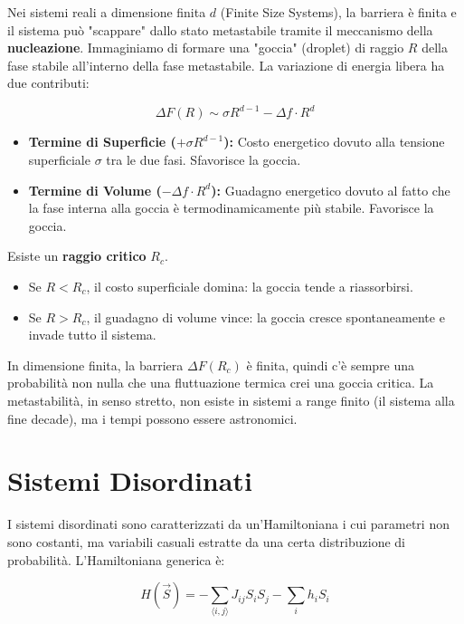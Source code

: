 Nei sistemi reali a dimensione finita $d$ (Finite Size Systems), la barriera è finita e il sistema può "scappare" dallo stato metastabile tramite il meccanismo della \textbf{nucleazione}.
Immaginiamo di formare una "goccia" (droplet) di raggio $R$ della fase stabile all'interno della fase metastabile. La variazione di energia libera ha due contributi:

\begin{equation}
    \Delta F(R) \sim \sigma R^{d-1} - \Delta f \cdot R^d
\end{equation}

\begin{itemize}
    \item \textbf{Termine di Superficie ($+\sigma R^{d-1}$):} Costo energetico dovuto alla tensione superficiale $\sigma$ tra le due fasi. Sfavorisce la goccia.
    \item \textbf{Termine di Volume ($-\Delta f \cdot R^d$):} Guadagno energetico dovuto al fatto che la fase interna alla goccia è termodinamicamente più stabile. Favorisce la goccia.
\end{itemize}

Esiste un \textbf{raggio critico} $R_c$.
\begin{itemize}
    \item Se $R < R_c$, il costo superficiale domina: la goccia tende a riassorbirsi.
    \item Se $R > R_c$, il guadagno di volume vince: la goccia cresce spontaneamente e invade tutto il sistema.
\end{itemize}

In dimensione finita, la barriera $\Delta F(R_c)$ è finita, quindi c'è sempre una probabilità non nulla che una fluttuazione termica crei una goccia critica. La metastabilità, in senso stretto, non esiste in sistemi a range finito (il sistema alla fine decade), ma i tempi possono essere astronomici.

\section{Sistemi Disordinati}


I sistemi disordinati sono caratterizzati da un'Hamiltoniana i cui parametri non sono costanti, ma variabili casuali estratte da una certa distribuzione di probabilità.
L'Hamiltoniana generica è:

\begin{equation}
    H(\vec{S}) = - \sum_{\langle i,j \rangle} J_{ij} S_i S_j - \sum_i h_i S_i
\end{equation}

